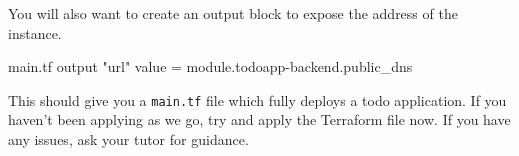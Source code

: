 \documentclass{csse4400}
\begin{document}
You will also want to create an output block to expose the address of the instance.
  
\begin{code}[language=terraform]{main.tf}
output "url" {
  value = module.todoapp-backend.public_dns
}
\end{code}

This should give you a \texttt{main.tf} file which fully deploys a todo application.
If you haven't been applying as we go,
try and apply the Terraform file now.
If you have any issues,
ask your tutor for guidance.



\end{document}
